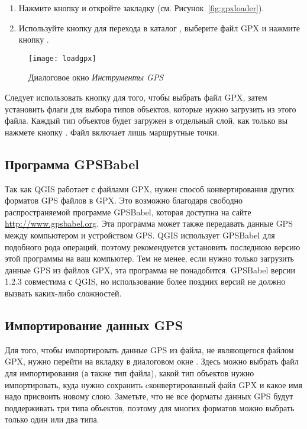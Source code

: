 \begin{enumerate}
\item Нажмите кнопку  и
откройте закладку  (см. Рисунок~\ref{fig:gpxloader}).
\item Используйте кнопку  для перехода в каталог
, выберите файл GPX
 и нажмите кнопку .
\end{enumerate}

\begin{figure}[ht]
   \centering
   \texttt{[image: loadgpx]}
   \caption{Диалоговое окно \emph{Инструменты GPS} \wincaption}\label{gpxloader}
\end{figure}

Следует использовать кнопку \browsebutton для того, чтобы выбрать файл
GPX, затем установить флаги для выбора типов объектов, которые нужно
загрузить из этого файла. Каждый тип объектов будет загружен в
отдельный слой, как только вы нажмете кнопку . Файл
 включает лишь маршрутные точки.

\subsection{Программа GPSBabel}

Так как QGIS работает с файлами GPX, нужен способ конвертирования других
форматов GPS файлов в GPX. Это возможно благодаря свободно
распространяемой программе GPSBabel, которая доступна на сайте
\url{http://www.gpsbabel.org}. Эта программа может также передавать
данные GPS между компьютером и устройством GPS. QGIS использует GPSBabel
для подобного рода операций, поэтому рекомендуется установить последнюю
версию этой программы на ваш компьютер. Тем не менее, если нужно только
загрузить данные GPS из файлов GPX, эта программа не понадобится.
GPSBabel версии 1.2.3 совместима с QGIS, но использование более поздних
версий не должно вызвать каких-либо сложностей.

\subsection{Импортирование данных GPS}

Для того, чтобы импортировать данные GPS из файла, не являющегося файлом
GPX, нужно перейти на вкладку  в диалоговом окне
. Здесь можно выбрать файл для импортирования
(а также тип файла), какой тип объектов нужно импортировать, куда нужно
сохранить cконвертированный файл GPX и какое имя надо присвоить новому
слою. Заметьте, что не все форматы данных GPS будут поддерживать 
три типа объектов, поэтому для многих форматов можно выбрать только один
или два типа.


